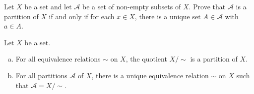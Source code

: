 \begin{exercise}
\label{exConditionsForPartition}
Let $X$ be a set and let $\mathcal{A}$ be a set of non-empty subsets of $X$. Prove that $\mathcal{A}$ is a partition of $X$ if and only if for each $x \in X$, there is a unique set $A \in \mathcal{A}$ with $a \in A$.
\end{exercise}

\begin{theorem}
\label{thmEquivalenceRelationsPartitions}
Let $X$ be a set.
\begin{enumerate}[(a)]
\item For all equivalence relations $\sim$ on $X$, the quotient $X/{\sim}$ is a partition of $X$.
\item For all partitions $\mathcal{A}$ of $X$, there is a unique equivalence relation $\sim$ on $X$ such that $\mathcal{A} = X/{\sim}$.
\end{enumerate}
\end{theorem}

